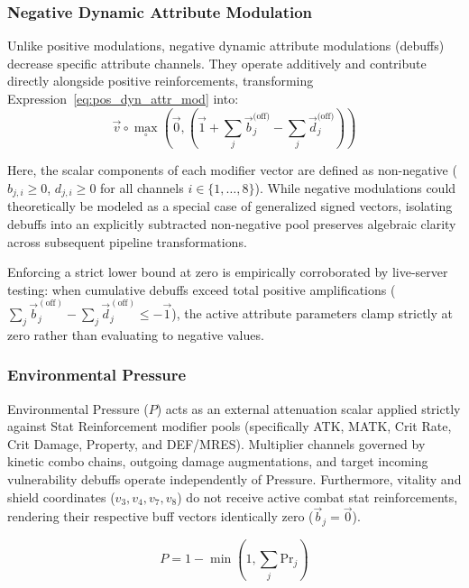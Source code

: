 \documentclass[twocolumn,10pt]{article}
\begin{document}
\subsubsection{Negative Dynamic Attribute Modulation}

Unlike positive modulations, negative dynamic attribute modulations (debuffs) decrease specific attribute channels. They operate additively and contribute directly alongside positive reinforcements, transforming Expression~\ref{eq:pos_dyn_attr_mod} into:
\begin{equation}
  \label{eq:neg_dyn_attr_mod}
  \vec{v} \circ \max_\circ \left(\vec{0}, \left(\vec{1} + \sum_{j}{\vec{b}_{j}^{\text{(off)}}} - \sum_{j}{\vec{d}_{j}^{\text{(off)}}} \right) \right)
\end{equation}

Here, the scalar components of each modifier vector are defined as non-negative ($b_{j,i} \ge 0$, $d_{j,i} \ge 0$ for all channels $i \in \{1, \dots, 8\}$). While negative modulations could theoretically be modeled as a special case of generalized signed vectors, isolating debuffs into an explicitly subtracted non-negative pool preserves algebraic clarity across subsequent pipeline transformations.

Enforcing a strict lower bound at zero is empirically corroborated by live-server testing: when cumulative debuffs exceed total positive amplifications ($\sum_j \vec{b}_j^{(\text{off})} - \sum_j \vec{d}_j^{(\text{off})} \le -\vec{1}$), the active attribute parameters clamp strictly at zero rather than evaluating to negative values.

\subsubsection{Environmental Pressure}

Environmental Pressure ($P$) acts as an external attenuation scalar applied strictly against Stat Reinforcement modifier pools (specifically ATK, MATK, Crit Rate, Crit Damage, Property, and DEF/MRES). Multiplier channels governed by kinetic combo chains, outgoing damage augmentations, and target incoming vulnerability debuffs operate independently of Pressure. Furthermore, vitality and shield coordinates ($v_3, v_4, v_7, v_8$) do not receive active combat stat reinforcements, rendering their respective buff vectors identically zero ($\vec{b}_j = \vec{0}$).

\begin{equation}
  P = 1 - \min \left( 1, \sum_{j}{\text{Pr}_j} \right)
\end{equation}
\end{document}
